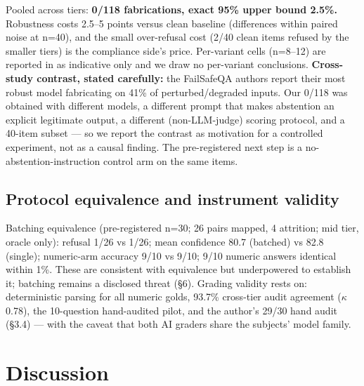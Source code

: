 \documentclass[11pt]{article}
\begin{document}
Pooled across tiers: \textbf{0/118 fabrications, exact 95\% upper bound 2.5\%.} Robustness costs 2.5--5 points versus clean baseline (differences within paired noise at n=40), and the small over-refusal cost (2/40 clean items refused by the smaller tiers) is the compliance side's price. Per-variant cells (n=8--12) are reported in  as indicative only and we draw no per-variant conclusions. \textbf{Cross-study contrast, stated carefully:} the FailSafeQA authors report their most robust model fabricating on 41\% of perturbed/degraded inputs. Our 0/118 was obtained with different models, a different prompt that makes abstention an explicit legitimate output, a different (non-LLM-judge) scoring protocol, and a 40-item subset --- so we report the contrast as motivation for a controlled experiment, not as a causal finding. The pre-registered next step is a no-abstention-instruction control arm on the same items.


\subsection{Protocol equivalence and instrument validity}

Batching equivalence (pre-registered n=30; 26 pairs mapped, 4 attrition; mid tier, oracle only): refusal 1/26 vs 1/26; mean confidence 80.7 (batched) vs 82.8 (single); numeric-arm accuracy 9/10 vs 9/10; 9/10 numeric answers identical within 1\%. These are consistent with equivalence but underpowered to establish it; batching remains a disclosed threat (\S{}6). Grading validity rests on: deterministic parsing for all numeric golds, 93.7\% cross-tier audit agreement ($\kappa$ 0.78), the 10-question hand-audited pilot, and the author's 29/30 hand audit (\S{}3.4) --- with the caveat that both AI graders share the subjects' model family.


\section{Discussion}
\end{document}
